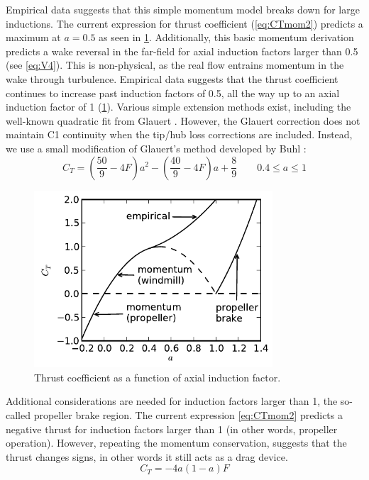 \documentclass{article}
\begin{document}
Empirical data suggests that this simple momentum model breaks down for large inductions.  The current expression for thrust coefficient (\cref{eq:CTmom2}) predicts a maximum at $a = 0.5$ as seen in \cref{fig:a}.  Additionally, this basic momentum derivation predicts a wake reversal in the far-field for axial induction factors larger than 0.5 (see \cref{eq:V4}).  This is non-physical, as the real flow entrains momentum in the wake through turbulence.  Empirical data suggests that the thrust coefficient continues to increase past induction factors of 0.5, all the way up to an axial induction factor of 1 (\cref{fig:a}).  Various simple extension methods exist, including the well-known quadratic fit from Glauert \cite{Glauert1926-General-Theory}.  However, the Glauert correction does not maintain C1 continuity when the tip/hub loss corrections are included.  Instead, we use a small modification of Glauert's method developed by Buhl \cite{Buhl2005-Empirical-Relationship}:
\begin{equation}
C_T = \left(\frac{50}{9} - 4F\right) a^2 - \left(\frac{40}{9} - 4F\right) a + \frac{8}{9} \qquad  0.4 \le a \le 1
\label{eq:CTBuhl}
\end{equation}

\begin{figure}[htbp]
\centering
\includegraphics[width=3.5in]{figures/a}
\caption{Thrust coefficient as a function of axial induction factor.}
\label{fig:a}
\end{figure}

Additional considerations are needed for induction factors larger than 1, the so-called propeller brake region.  The current expression \cref{eq:CTmom2} predicts a negative thrust for induction factors larger than 1 (in other words, propeller operation).  However, repeating the momentum conservation, suggests that the thrust changes signs, in other words it still acts as a drag device.
\begin{equation}
    C_T = - 4 a (1 - a) F
    \label{eq:CTpb}
\end{equation}
\end{document}

